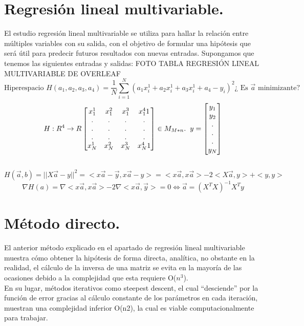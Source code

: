 \documentclass[a4paper,10pt]{article}
\begin{document}
\section{Regresión lineal multivariable.}
\noindent
El estudio regresión lineal multivariable se utiliza para hallar la relación entre múltiples variables con su salida, con el objetivo de formular una hipótesis que será útil para predecir futuros resultados con nuevas entradas. Supongamos que tenemos las siguientes entradas y salidas: 
FOTO TABLA REGRESIÓN LINEAL MULTIVARIABLE DE OVERLEAF
 \[\text{Hiperespacio } H(a_{1},a_{2},a_{3},a_{4})=\frac{1}{N}\sum_{i=1}^{N}(a_{1}x_i^1+a_{2}x_i^1+a_{3}x_i^1+a_{4}-y_{i})^2 \text{¿ Es } \vec{a}\text{ minimizante?}
\]
\[H:R^4\rightarrow R \begin{bmatrix}
    x_{1}^1 & x_{1}^2 & x_{1}^3 & x_{1}^4 1 \\
    .&.&.&.\\
    .&.&.&.\\
    .&.&.&.\\
    x_{N}^1 & x_{N}^2 & x_{N}^3 & x_{N}^4 1
\end{bmatrix} \in M_{M*n}. \hspace{0.20cm} y=\begin{bmatrix}y_{1}\\y_{2}\\.\\.\\.\\y_{N}\end{bmatrix}\] \\ \[H(\vec{a},b)=||X\vec{a}-y||^2 = <x\vec{a}-\vec{y},x\vec{a}-y>=<x\vec{a},x\vec{a}>-2<X\vec{a},y>+<y,y>\]
\[\nabla H(a)=\nabla<x\vec{a},x\vec{a}>-2\nabla<x\vec{a},\vec{y}>=0\Leftrightarrow \boxed{ \vec{a}=(X^T X)^{-1} X^T y}\]

\section{Método directo.}
\noindent
El anterior método explicado en el apartado de regresión lineal multivariable muestra cómo obtener la hipótesis de forma directa, analítica, no obstante en la realidad, el cálculo de la inversa de una matriz se evita en la mayoría de las ocasiones debido a la complejidad que esta requiere O($n^3$).\\
En su lugar, métodos iterativos como steepest descent, el cual “desciende” por la función de error gracias al cálculo constante de los parámetros en cada iteración, muestran una complejidad inferior O(n2), la cual es viable computacionalmente para trabajar. 
\end{document}
